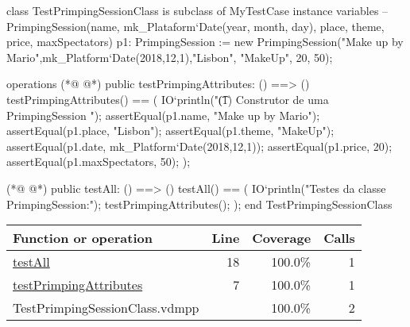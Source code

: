 \begin{vdmpp}[breaklines=true]
class TestPrimpingSessionClass is subclass of MyTestCase
instance variables
 -- PrimpingSession(name, mk_Plataform`Date(year, month, day), place, theme, price, maxSpectators)
 p1: PrimpingSession := new PrimpingSession("Make up by Mario",mk_Platform`Date(2018,12,1),"Lisbon", "MakeUp", 20, 50);
  
operations
(*@
\label{testPrimpingAttributes:7}
@*)
 public testPrimpingAttributes: () ==> ()
 testPrimpingAttributes() == (
 IO`println("\t (1) Construtor de uma PrimpingSession ");
  assertEqual(p1.name, "Make up by Mario");
  assertEqual(p1.place, "Lisbon");
  assertEqual(p1.theme, "MakeUp");
  assertEqual(p1.date, mk_Platform`Date(2018,12,1));
  assertEqual(p1.price, 20);
  assertEqual(p1.maxSpectators, 50);
 );
  
(*@
\label{testAll:18}
@*)
 public testAll: () ==> ()
 testAll() == (
 IO`println("Testes da classe PrimpingSession:");
  testPrimpingAttributes();
 );
end TestPrimpingSessionClass
\end{vdmpp}
\bigskip
\begin{longtable}{|l|r|r|r|}
\hline
Function or operation & Line & Coverage & Calls \\
\hline
\hline
\hyperref[testAll:18]{testAll} & 18&100.0\% & 1 \\
\hline
\hyperref[testPrimpingAttributes:7]{testPrimpingAttributes} & 7&100.0\% & 1 \\
\hline
\hline
TestPrimpingSessionClass.vdmpp & & 100.0\% & 2 \\
\hline
\end{longtable}


